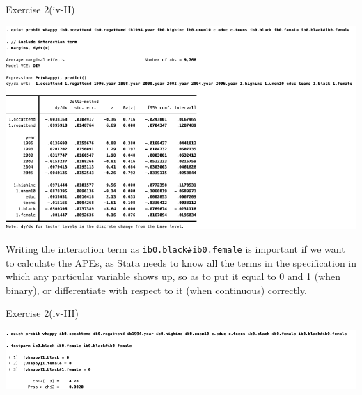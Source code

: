 \documentclass[
  10pt,
  ignorenonframetext,
]{beamer}
\begin{document}
\begin{frame}[fragile]{Exercise 2(iv-II)}
\protect\hypertarget{ex2-PROBIT-APE-add7ctrls}{}
\begin{center}\includegraphics[width=0.8\linewidth]{pictures/ex2-PROBIT-APE-add7ctrls} \end{center}

\footnotesize

Writing the interaction term as \texttt{ib0.black\#ib0.female} is
important if we want to calculate the APEs, as Stata needs to know all
the terms in the specification in which any particular variable shows
up, so as to put it equal to 0 and 1 (when binary), or differentiate
with respect to it (when continuous) correctly.
\end{frame}

\begin{frame}{Exercise 2(iv-III)}
\protect\hypertarget{ex2-PROBIT-APE-add7ctrls-test}{}
\begin{center}\includegraphics[width=1\linewidth]{pictures/ex2-PROBIT-APE-add7ctrls-test} \end{center}
\end{frame}
\end{document}
